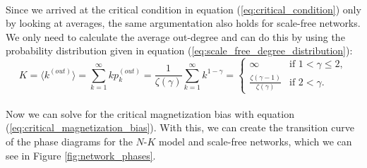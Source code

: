 \paragraph{}
Since we arrived at the critical condition in equation (\ref{eq:critical_condition}) only by looking at averages, the same argumentation also holds for scale-free networks. We only need to calculate the average out-degree and can do this by using the probability distribution given in equation (\ref{eq:scale_free_degree_distribution}):
\begin{equation}
K = \langle k^{(out)}\rangle = \sum\limits_{k=1}^{\infty}kp_k^{(out)} = \frac{1}{\zeta(\gamma)}\sum\limits_{k=1}^{\infty}k^{1-\gamma} =
\begin{cases}
	\infty                                & \text{if } 1 < \gamma \leq 2, \\
	\frac{\zeta(\gamma-1)}{\zeta(\gamma)} & \text{if } 2 < \gamma .
\end{cases}
\end{equation}

\paragraph*{}
Now we can solve for the critical magnetization bias with equation (\ref{eq:critical_magnetization_bias}). With this, we can create the transition curve of the phase diagrams for the $N$-$K$ model and scale-free networks, which we can see in Figure \ref{fig:network_phases}.

